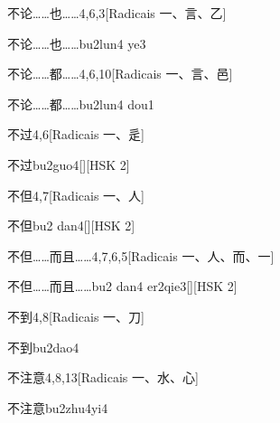 \begin{entry}{不论……也……}{4,6,3}[Radicais ⼀、⾔、⼄]
  \begin{phonetics}{不论……也……}{bu2lun4 ye3}
  \end{phonetics}
\end{entry}

\begin{entry}{不论……都……}{4,6,10}[Radicais ⼀、⾔、⾢]
  \begin{phonetics}{不论……都……}{bu2lun4 dou1}
  \end{phonetics}
\end{entry}

\begin{entry}{不过}{4,6}[Radicais ⼀、⾡]
  \begin{phonetics}{不过}{bu2guo4}[][HSK 2]
  \end{phonetics}
\end{entry}

\begin{entry}{不但}{4,7}[Radicais ⼀、⼈]
  \begin{phonetics}{不但}{bu2 dan4}[][HSK 2]
  \end{phonetics}
\end{entry}

\begin{entry}{不但……而且……}{4,7,6,5}[Radicais ⼀、⼈、⽽、⼀]
  \begin{phonetics}{不但……而且……}{bu2 dan4 er2qie3}[][HSK 2]
  \end{phonetics}
\end{entry}

\begin{entry}{不到}{4,8}[Radicais ⼀、⼑]
  \begin{phonetics}{不到}{bu2dao4}
  \end{phonetics}
\end{entry}

\begin{entry}{不注意}{4,8,13}[Radicais ⼀、⽔、⼼]
  \begin{phonetics}{不注意}{bu2zhu4yi4}
  \end{phonetics}
\end{entry}

